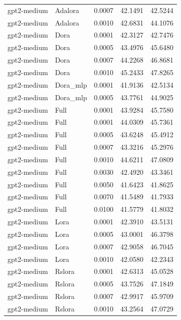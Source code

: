 \begin{tabular}{llrrr}
gpt2-medium & Adalora & 0.0007 & 42.1491 & 42.5244 \\
gpt2-medium & Adalora & 0.0010 & 42.6831 & 44.1076 \\
gpt2-medium & Dora & 0.0001 & 42.3127 & 42.7476 \\
gpt2-medium & Dora & 0.0005 & 43.4976 & 45.6480 \\
gpt2-medium & Dora & 0.0007 & 44.2268 & 46.8681 \\
gpt2-medium & Dora & 0.0010 & 45.2433 & 47.8265 \\
gpt2-medium & Dora_mlp & 0.0001 & 41.9136 & 42.5134 \\
gpt2-medium & Dora_mlp & 0.0005 & 43.7761 & 44.9025 \\
gpt2-medium & Full & 0.0001 & 43.9284 & 45.7580 \\
gpt2-medium & Full & 0.0001 & 44.0309 & 45.7361 \\
gpt2-medium & Full & 0.0005 & 43.6248 & 45.4912 \\
gpt2-medium & Full & 0.0007 & 43.3216 & 45.2976 \\
gpt2-medium & Full & 0.0010 & 44.6211 & 47.0809 \\
gpt2-medium & Full & 0.0030 & 42.4920 & 43.3461 \\
gpt2-medium & Full & 0.0050 & 41.6423 & 41.8625 \\
gpt2-medium & Full & 0.0070 & 41.5489 & 41.7933 \\
gpt2-medium & Full & 0.0100 & 41.5779 & 41.8032 \\
gpt2-medium & Lora & 0.0001 & 42.3910 & 43.5131 \\
gpt2-medium & Lora & 0.0005 & 43.0001 & 46.3798 \\
gpt2-medium & Lora & 0.0007 & 42.9058 & 46.7045 \\
gpt2-medium & Lora & 0.0010 & 42.0580 & 42.2343 \\
gpt2-medium & Rslora & 0.0001 & 42.6313 & 45.0528 \\
gpt2-medium & Rslora & 0.0005 & 43.7526 & 47.1849 \\
gpt2-medium & Rslora & 0.0007 & 42.9917 & 45.9709 \\
gpt2-medium & Rslora & 0.0010 & 43.2564 & 47.0729 \\
\bottomrule
\end{tabular}
